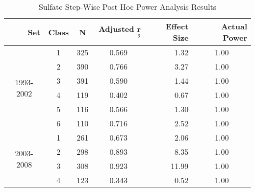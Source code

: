 \begin{table}[htbp]
  \centering
	  \caption{Sulfate Step-Wise Post Hoc Power Analysis Results}
    \begin{tabular}{rrcrrr}
    \toprule
    Set   & Class & N     & Adjusted r$^2$ & Effect Size & Actual Power \\
    \midrule
    \multicolumn{1}{c}{\multirow{6}[1]{*}{\begin{sideways}1993-2002\end{sideways}}} & \multicolumn{1}{c}{1} & \multicolumn{1}{c}{325} & \multicolumn{1}{c}{0.569 } & \multicolumn{1}{r}{1.32 } & \multicolumn{1}{c}{1.00 } \\
    \multicolumn{1}{c}{} & \multicolumn{1}{c}{2} & \multicolumn{1}{c}{390} & \multicolumn{1}{c}{0.766 } & \multicolumn{1}{r}{3.27 } & \multicolumn{1}{c}{1.00 } \\
    \multicolumn{1}{c}{} & \multicolumn{1}{c}{3} & \multicolumn{1}{c}{391} & \multicolumn{1}{c}{0.590 } & \multicolumn{1}{r}{1.44 } & \multicolumn{1}{c}{1.00 } \\
    \multicolumn{1}{c}{} & \multicolumn{1}{c}{4} & \multicolumn{1}{c}{119} & \multicolumn{1}{c}{0.402 } & \multicolumn{1}{r}{0.67 } & \multicolumn{1}{c}{1.00 } \\
    \multicolumn{1}{c}{} & \multicolumn{1}{c}{5} & \multicolumn{1}{c}{116} & \multicolumn{1}{c}{0.566 } & \multicolumn{1}{r}{1.30 } & \multicolumn{1}{c}{1.00 } \\
    \multicolumn{1}{c}{} & \multicolumn{1}{c}{6} & \multicolumn{1}{c}{110} & \multicolumn{1}{c}{0.716 } & \multicolumn{1}{r}{2.52 } & \multicolumn{1}{c}{1.00 } \\\midrule
    \multicolumn{1}{c}{\multirow{6}[2]{*}{\begin{sideways}2003-2008\end{sideways}}} & \multicolumn{1}{c}{1} & \multicolumn{1}{c}{261} & \multicolumn{1}{c}{0.673 } & \multicolumn{1}{r}{2.06 } & \multicolumn{1}{c}{1.00 } \\
    \multicolumn{1}{c}{} & \multicolumn{1}{c}{2} & \multicolumn{1}{c}{298} & \multicolumn{1}{c}{0.893 } & \multicolumn{1}{r}{8.35 } & \multicolumn{1}{c}{1.00 } \\
    \multicolumn{1}{c}{} & \multicolumn{1}{c}{3} & \multicolumn{1}{c}{308} & \multicolumn{1}{c}{0.923 } & \multicolumn{1}{r}{11.99 } & \multicolumn{1}{c}{1.00 } \\
    \multicolumn{1}{c}{} & \multicolumn{1}{c}{4} & \multicolumn{1}{c}{123} & \multicolumn{1}{c}{0.343 } & \multicolumn{1}{r}{0.52 } & \multicolumn{1}{c}{1.00 } \\

\end{tabular}
\end{table}
